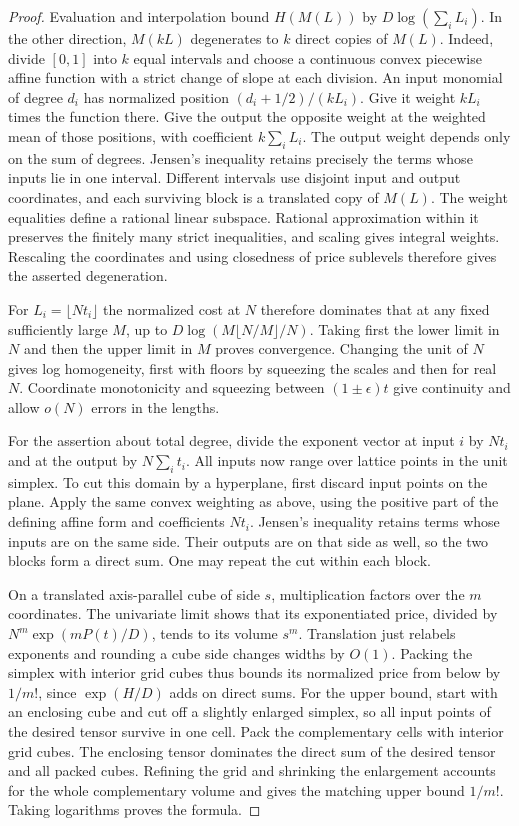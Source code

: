 \begin{proof}
Evaluation and interpolation bound $H(M(L))$ by $D\log(\sum_iL_i)$.
In the other direction, $M(kL)$ degenerates to $k$ direct copies of
$M(L)$. Indeed, divide $[0,1]$ into $k$ equal intervals and choose a
continuous convex piecewise affine function with a strict change of slope
at each division. An input monomial of degree $d_i$ has normalized position
$(d_i+1/2)/(kL_i)$. Give it weight $kL_i$ times the function there. Give the
output the opposite weight at the weighted mean of those positions, with
coefficient $k\sum_i L_i$. The output weight depends only on the sum of
degrees. Jensen's inequality retains precisely the terms whose inputs lie
in one interval. Different intervals use disjoint input and output
coordinates, and each surviving block is a translated copy of $M(L)$.
The weight equalities define a rational linear subspace. Rational
approximation within it preserves the finitely many strict inequalities,
and scaling gives integral weights. Rescaling the coordinates and using
closedness of price sublevels therefore gives the asserted degeneration.

For $L_i=\lfloor Nt_i\rfloor$ the normalized cost at $N$ therefore
dominates that at any fixed sufficiently large $M$, up to
$D\log(M\lfloor N/M\rfloor/N)$. Taking first the lower limit in $N$ and
then the upper limit in $M$ proves convergence. Changing the unit of $N$
gives log homogeneity, first with floors by squeezing the scales and then
for real $N$. Coordinate monotonicity and squeezing between
$(1\pm\epsilon)t$ give continuity and allow $o(N)$ errors in the lengths.

For the assertion about total degree, divide the exponent vector at
input $i$ by $Nt_i$ and at the output by $N\sum_i t_i$. All inputs now
range over lattice points in the unit simplex. To cut this domain by a
hyperplane, first discard input points on the plane. Apply the same
convex weighting as above, using the positive part of the defining
affine form and coefficients $Nt_i$. Jensen's inequality retains terms
whose inputs are on the same side. Their outputs are on that side as
well, so the two blocks form a direct sum. One may repeat the cut within
each block.

On a translated axis-parallel cube of side $s$, multiplication factors
over the $m$ coordinates. The univariate limit shows that its
exponentiated price, divided by $N^m\exp(mP(t)/D)$, tends to its volume
$s^m$. Translation just relabels exponents and rounding a cube side
changes widths by $O(1)$. Packing the simplex with interior grid cubes
thus bounds its normalized price from below by $1/m!$, since
$\exp(H/D)$ adds on direct sums. For the upper bound, start with an
enclosing cube and cut off a slightly enlarged simplex, so all input
points of the desired tensor survive in one cell. Pack the complementary
cells with interior grid cubes. The enclosing tensor dominates the
direct sum of the desired tensor and all packed cubes. Refining the
grid and shrinking the enlargement accounts for the whole complementary
volume and gives the matching upper bound $1/m!$. Taking logarithms
proves the formula.
\end{proof}

